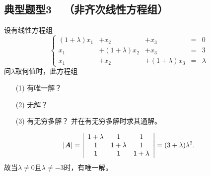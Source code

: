 \subsection{典型题型3~~（非齐次线性方程组）}

\begin{frame}\ft{\subsecname}
  
    \begin{li}[$\bigstar\bigstar\bigstar\bigstar\bigstar$]
      设有线性方程组
      $$
      \left\{
      \begin{array}{rrrcr}
        (1+\lambda)x_1&+x_2&+x_3&=&0\\[0.05in]
        x_1&+(1+\lambda)x_2&+x_3&=&3\\[0.05in]
        x_1&+x_2&+(1+\lambda)x_3&=&\lambda
      \end{array}
      \right.
      $$
      问$\lambda$取何值时，此方程组
      \begin{itemize}
      \item[(1)]有唯一解？
      \item[(2)]无解？ 
      \item[(3)]有无穷多解？ 并在有无穷多解时求其通解。
      \end{itemize}
    \end{li}
    \pause

    \begin{jie}
    $$
    |\boldsymbol{A}|=\left|
    \begin{array}{ccc}
      1+\lambda&1&1\\
      1&1+\lambda&1\\
      1&1&1+\lambda
    \end{array}
    \right| = (3+\lambda)\lambda^2.
    $$
    故当$\lambda\ne0$且$\lambda\ne-3$时，有唯一解。
  \end{jie}
\end{frame}



